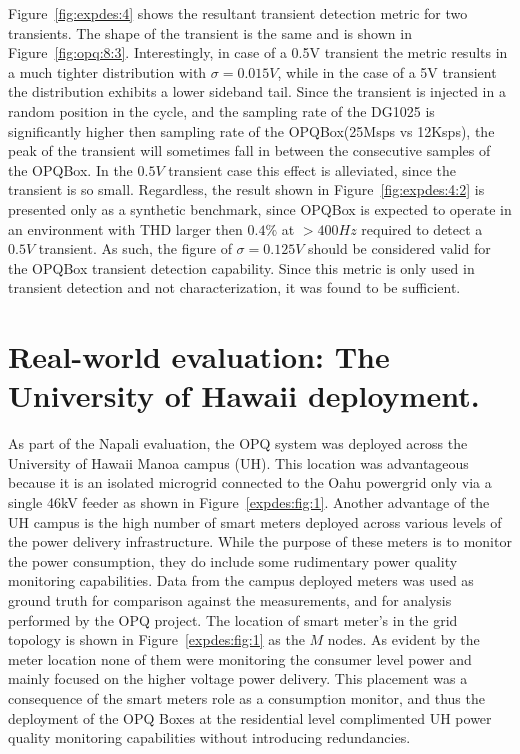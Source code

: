 Figure~\ref{fig:expdes:4} shows the resultant transient detection metric for two transients.
The shape of the transient is the same and is shown in Figure~\ref{fig:opq:8:3}.
Interestingly, in case of a 0.5V transient the metric results in a much tighter distribution with $\sigma =0.015V$, while in the case of
a 5V transient the distribution exhibits a lower sideband tail.
Since the transient is injected in a random position in the cycle, and the sampling rate of the DG1025 is significantly higher then sampling rate of the OPQBox(25Msps vs 12Ksps), the peak of the transient will sometimes fall in between the consecutive samples of the OPQBox.
In the $0.5V$ transient case this effect is alleviated, since the transient is so small.
Regardless, the result shown in Figure~\ref{fig:expdes:4:2} is presented only as a synthetic benchmark, since OPQBox is expected to operate in an environment with THD larger then $0.4\%$ at $>400Hz$ required to detect a $0.5V$ transient.
As such, the figure of $\sigma=0.125V$ should be considered valid for the OPQBox transient detection capability.
Since this metric is only used in transient detection and not characterization, it was found to be sufficient.
\clearpage
\section{Real-world evaluation: The University of Hawaii deployment.}\label{sec:university-of-hawaii-deployment.2}

As part of the Napali evaluation, the OPQ system was deployed across the University of Hawaii Manoa campus (UH).
This location was advantageous because it is an isolated microgrid connected to the Oahu powergrid only via a single 46kV feeder as shown in Figure~\ref{expdes:fig:1}.
Another advantage of the UH campus is the high number of smart meters deployed across various levels of the power delivery infrastructure.
While the purpose of these meters is to monitor the power consumption, they do include some rudimentary power quality monitoring capabilities.
Data from the campus deployed meters was used as ground truth for comparison against the measurements, and for analysis performed by the OPQ project.
The location of smart meter's in the grid topology is shown in Figure~\ref{expdes:fig:1} as the $M$ nodes.
As evident by the meter location none of them were monitoring the consumer level power and mainly focused on the higher voltage power delivery.
This placement was a consequence of the smart meters role as a consumption monitor, and thus the deployment of the OPQ Boxes at the residential level complimented UH power quality monitoring capabilities without introducing redundancies.

